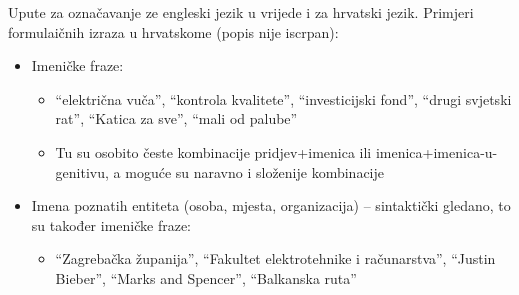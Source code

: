 \documentclass[12pt]{article}
\begin{document}
\maketitle
 

Upute za označavanje ze engleski jezik u vrijede i za hrvatski jezik. Primjeri formulaičnih izraza u
hrvatskome (popis nije iscrpan):

\begin{itemize}
\item Imeničke fraze:
\begin{itemize}
\item ``električna vuča'', ``kontrola kvalitete'', ``investicijski fond'', ``drugi svjetski rat'', ``Katica
za sve'', ``mali od palube''
\item Tu su osobito česte kombinacije pridjev+imenica ili imenica+imenica-u-genitivu, a moguće su
naravno i složenije kombinacije
\end{itemize}
\item Imena poznatih entiteta (osoba, mjesta, organizacija) – sintaktički gledano, to su također imeničke
fraze:
\begin{itemize}
\item ``Zagrebačka županija'', ``Fakultet elektrotehnike i računarstva'', ``Justin Bieber'', ``Marks
and Spencer'', ``Balkanska ruta''
\end{itemize}


\end{itemize}
\end{document}
